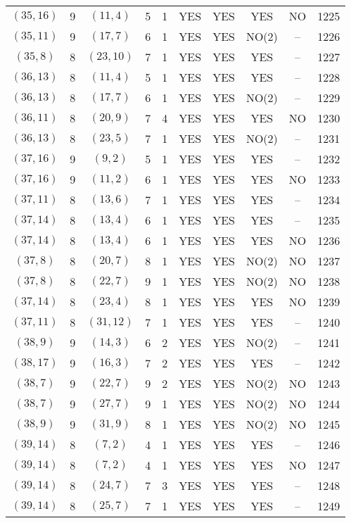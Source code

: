 \begin{longtable}{|c|c|c|c|c|c|c|c|c|c|}
$(35, 16)$ & 9 & $(11, 4)$ & 5 & 1 & YES & YES & YES & NO & 1225\\
$(35, 11)$ & 9 & $(17, 7)$ & 6 & 1 & YES & YES & NO(2) & -- & 1226\\
$(35, 8)$ & 8 & $(23, 10)$ & 7 & 1 & YES & YES & YES & -- & 1227\\
$(36, 13)$ & 8 & $(11, 4)$ & 5 & 1 & YES & YES & YES & -- & 1228\\
$(36, 13)$ & 8 & $(17, 7)$ & 6 & 1 & YES & YES & NO(2) & -- & 1229\\
$(36, 11)$ & 8 & $(20, 9)$ & 7 & 4 & YES & YES & YES & NO & 1230\\
$(36, 13)$ & 8 & $(23, 5)$ & 7 & 1 & YES & YES & NO(2) & -- & 1231\\
$(37, 16)$ & 9 & $(9, 2)$ & 5 & 1 & YES & YES & YES & -- & 1232\\
$(37, 16)$ & 9 & $(11, 2)$ & 6 & 1 & YES & YES & YES & NO & 1233\\
$(37, 11)$ & 8 & $(13, 6)$ & 7 & 1 & YES & YES & YES & -- & 1234\\
$(37, 14)$ & 8 & $(13, 4)$ & 6 & 1 & YES & YES & YES & -- & 1235\\
$(37, 14)$ & 8 & $(13, 4)$ & 6 & 1 & YES & YES & YES & NO & 1236\\
$(37, 8)$ & 8 & $(20, 7)$ & 8 & 1 & YES & YES & NO(2) & NO & 1237\\
$(37, 8)$ & 8 & $(22, 7)$ & 9 & 1 & YES & YES & NO(2) & NO & 1238\\
$(37, 14)$ & 8 & $(23, 4)$ & 8 & 1 & YES & YES & YES & NO & 1239\\
$(37, 11)$ & 8 & $(31, 12)$ & 7 & 1 & YES & YES & YES & -- & 1240\\
$(38, 9)$ & 9 & $(14, 3)$ & 6 & 2 & YES & YES & NO(2) & -- & 1241\\
$(38, 17)$ & 9 & $(16, 3)$ & 7 & 2 & YES & YES & YES & -- & 1242\\
$(38, 7)$ & 9 & $(22, 7)$ & 9 & 2 & YES & YES & NO(2) & NO & 1243\\
$(38, 7)$ & 9 & $(27, 7)$ & 9 & 1 & YES & YES & NO(2) & NO & 1244\\
$(38, 9)$ & 9 & $(31, 9)$ & 8 & 1 & YES & YES & NO(2) & NO & 1245\\
$(39, 14)$ & 8 & $(7, 2)$ & 4 & 1 & YES & YES & YES & -- & 1246\\
$(39, 14)$ & 8 & $(7, 2)$ & 4 & 1 & YES & YES & YES & NO & 1247\\
$(39, 14)$ & 8 & $(24, 7)$ & 7 & 3 & YES & YES & YES & -- & 1248\\
$(39, 14)$ & 8 & $(25, 7)$ & 7 & 1 & YES & YES & YES & -- & 1249\\

\end{longtable}
